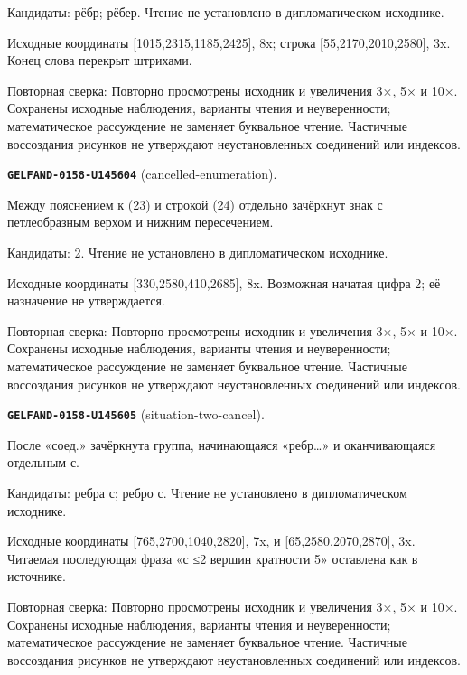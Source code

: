 Кандидаты: рёбр; рёбер. Чтение не установлено в дипломатическом исходнике.\par
Исходные координаты [1015,2315,1185,2425], 8x; строка [55,2170,2010,2580], 3x. Конец слова перекрыт штрихами.\par
Повторная сверка: Повторно просмотрены исходник и увеличения 3×, 5× и 10×. Сохранены исходные наблюдения, варианты чтения и неуверенности; математическое рассуждение не заменяет буквальное чтение. Частичные воссоздания рисунков не утверждают неустановленных соединений или индексов.\par\medskip
\par\noindent\leavevmode{}\label{GELFAND-0158-U145604}\label{GELFAND-P001456:cancelled-enumeration}\textbf{\texttt{GELFAND-0158-U145604}} (cancelled-enumeration).\nopagebreak[4]\par
Между пояснением к (23) и строкой (24) отдельно зачёркнут знак с петлеобразным верхом и нижним пересечением.\par
Кандидаты: 2. Чтение не установлено в дипломатическом исходнике.\par
Исходные координаты [330,2580,410,2685], 8x. Возможная начатая цифра 2; её назначение не утверждается.\par
Повторная сверка: Повторно просмотрены исходник и увеличения 3×, 5× и 10×. Сохранены исходные наблюдения, варианты чтения и неуверенности; математическое рассуждение не заменяет буквальное чтение. Частичные воссоздания рисунков не утверждают неустановленных соединений или индексов.\par\medskip
\par\noindent\leavevmode{}\label{GELFAND-0158-U145605}\label{GELFAND-P001456:situation-two-cancel}\textbf{\texttt{GELFAND-0158-U145605}} (situation-two-cancel).\nopagebreak[4]\par
После «соед.» зачёркнута группа, начинающаяся «ребр…» и оканчивающаяся отдельным с.\par
Кандидаты: ребра с; ребро с. Чтение не установлено в дипломатическом исходнике.\par
Исходные координаты [765,2700,1040,2820], 7x, и [65,2580,2070,2870], 3x. Читаемая последующая фраза «с ≤2 вершин кратности 5» оставлена как в источнике.\par
Повторная сверка: Повторно просмотрены исходник и увеличения 3×, 5× и 10×. Сохранены исходные наблюдения, варианты чтения и неуверенности; математическое рассуждение не заменяет буквальное чтение. Частичные воссоздания рисунков не утверждают неустановленных соединений или индексов.\par\medskip
